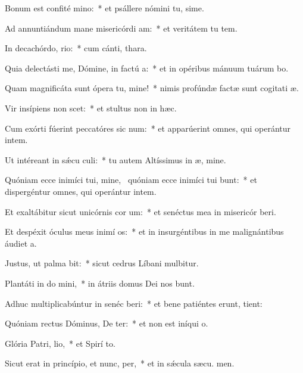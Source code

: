 \item Bonum est confité mino:~* et psállere nómini tu, sime.
\item Ad annuntiándum mane misericórdi am:~* et veritátem tu  tem.
\item In decachórdo, rio:~* cum cánti,  thara.
\item Quia delectásti me, Dómine, in factú a:~* et in opéribus mánuum tuárum bo.
\item Quam magnificáta sunt ópera tu, mine!~* nimis profúndæ factæ sunt cogitati æ.
\item Vir insípiens non scet:~* et stultus non in hæc.
\item Cum exórti fúerint peccatóres sic num:~* et apparúerint omnes, qui operántur intem.
\item Ut intéreant in sǽcu culi:~* tu autem Altíssimus in æ, mine.
\item Quóniam ecce inimíci tui, mine,~\pscross{} quóniam ecce inimíci tui bunt:~* et dispergéntur omnes, qui operántur intem.
\item Et exaltábitur sicut unicórnis cor um:~* et senéctus mea in misericór beri.
\item Et despéxit óculus meus inimí os:~* et in insurgéntibus in me malignántibus áudiet  a.
\item Justus, ut palma bit:~* sicut cedrus Líbani mulbitur.
\item Plantáti in do mini,~* in átriis domus Dei nos bunt.
\item Adhuc multiplicabúntur in senéc beri:~* et bene patiéntes erunt,  tient:
\item Quóniam rectus Dóminus, De ter:~* et non est iníqui  o.
\item Glória Patri,  lio,~* et Spirí to.
\item Sicut erat in princípio, et nunc,  per,~* et in sǽcula sæcu. men.
